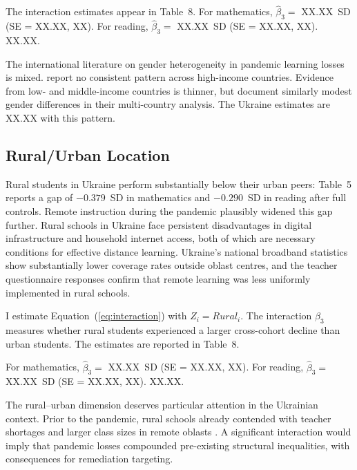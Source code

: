 The interaction estimates appear in Table~8. For
mathematics, $\hat{\beta}_3 =$ XX.XX~SD (SE = XX.XX, XX). %
For reading, $\hat{\beta}_3 =$ XX.XX~SD (SE = XX.XX, XX). %
XX.XX. %

The international literature on gender heterogeneity in pandemic learning
losses is mixed. \citet{betthaeuser2023systematic} report no consistent
pattern across high-income countries. Evidence from low- and
middle-income countries is thinner, but \citet{patrinos2022analysis}
document similarly modest gender differences in their multi-country
analysis. The Ukraine estimates are XX.XX %
with this pattern.

\subsection{Rural/Urban Location}
\label{subsec:rural}

Rural students in Ukraine perform substantially below their urban peers:
Table~5 reports a gap of $-0.379$~SD in mathematics and $-0.290$~SD in
reading after full controls. Remote instruction during the pandemic
plausibly widened this gap further. Rural schools in Ukraine face
persistent disadvantages in digital infrastructure and household internet
access, both of which are necessary conditions for effective distance
learning. Ukraine's national broadband statistics show substantially lower
coverage rates outside oblast centres, and the teacher questionnaire
responses confirm that remote learning was less uniformly implemented
in rural schools.

I estimate Equation~(\ref{eq:interaction}) with $Z_i = \mathit{Rural}_i$.
The interaction $\hat{\beta}_3$ measures whether rural students
experienced a larger cross-cohort decline than urban students. The
estimates are reported in Table~8.

For mathematics, $\hat{\beta}_3 =$ XX.XX~SD (SE = XX.XX, XX). %
For reading, $\hat{\beta}_3 =$ XX.XX~SD (SE = XX.XX, XX). %
XX.XX. %

The rural--urban dimension deserves particular attention in the Ukrainian
context. Prior to the pandemic, rural schools already contended with
teacher shortages and larger class sizes in remote oblasts
\citep[see][]{world_bank2021ukraine}. A significant interaction would
imply that pandemic losses compounded pre-existing structural
inequalities, with consequences for remediation targeting.

